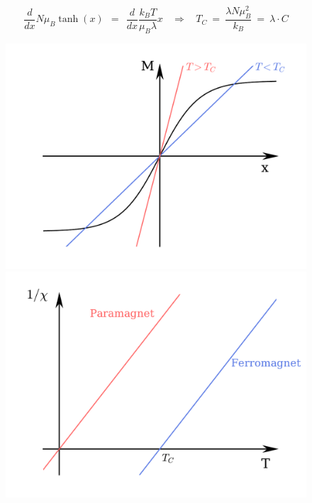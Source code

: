 \documentclass[10pt]{report}
\numberwithin{equation}{chapter}
\begin{document}
\begin{equation}
  \frac{d}{dx} N \mu_B \tanh(x) ~~ = ~~ \frac{d}{dx} \frac{k_BT}{\mu_B \lambda} x ~~~~ \Rightarrow ~~~~
  T_C ~=~\frac{\lambda N \mu_B^2}{k_B} ~=~ \lambda \cdot C
\end{equation}


\begin{figure}[t]
  \begin{minipage}[c][6.00cm]{.5\textwidth}
    \vspace*{\fill}
    \centering
    \includegraphics[width=0.916\linewidth]{../img/ferromag_graph_sol.pdf}
    \captionsetup{width=.95\linewidth}
  \end{minipage}%
  \begin{minipage}[c][6.00cm]{.5\textwidth}
    \vspace*{\fill}
    \centering
    \includegraphics[width=0.95\linewidth]{../img/ferro_para_compar.pdf}
    \captionsetup{width=.95\linewidth}
  \end{minipage}
  \label{fig:2:tests}
\end{figure}
\end{document}
